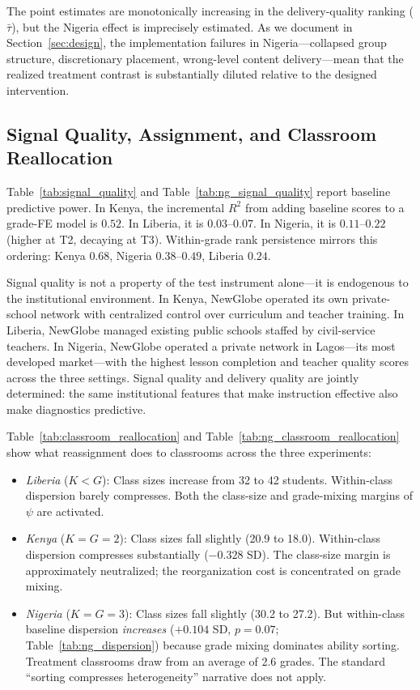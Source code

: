 \documentclass[11pt]{article}
\begin{document}
The point estimates are monotonically increasing in the delivery-quality ranking ($\bar{\tau}$), but the Nigeria effect is imprecisely estimated. As we document in Section~\ref{sec:design}, the implementation failures in Nigeria---collapsed group structure, discretionary placement, wrong-level content delivery---mean that the realized treatment contrast is substantially diluted relative to the designed intervention.

\subsection{Signal Quality, Assignment, and Classroom Reallocation}

Table~\ref{tab:signal_quality} and Table~\ref{tab:ng_signal_quality} report baseline predictive power. In Kenya, the incremental $R^2$ from adding baseline scores to a grade-FE model is $0.52$. In Liberia, it is $0.03$--$0.07$. In Nigeria, it is $0.11$--$0.22$ (higher at T2, decaying at T3). Within-grade rank persistence mirrors this ordering: Kenya $0.68$, Nigeria $0.38$--$0.49$, Liberia $0.24$.

Signal quality is not a property of the test instrument alone---it is endogenous to the institutional environment. In Kenya, NewGlobe operated its own private-school network with centralized control over curriculum and teacher training. In Liberia, NewGlobe managed existing public schools staffed by civil-service teachers. In Nigeria, NewGlobe operated a private network in Lagos---its most developed market---with the highest lesson completion and teacher quality scores across the three settings. Signal quality and delivery quality are jointly determined: the same institutional features that make instruction effective also make diagnostics predictive.

Table~\ref{tab:classroom_reallocation} and Table~\ref{tab:ng_classroom_reallocation} show what reassignment does to classrooms across the three experiments:

\begin{itemize}
\item \emph{Liberia} ($K < G$): Class sizes increase from 32 to 42 students. Within-class dispersion barely compresses. Both the class-size and grade-mixing margins of $\psi$ are activated.

\item \emph{Kenya} ($K = G = 2$): Class sizes fall slightly (20.9 to 18.0). Within-class dispersion compresses substantially ($-0.328$ SD). The class-size margin is approximately neutralized; the reorganization cost is concentrated on grade mixing.

\item \emph{Nigeria} ($K = G = 3$): Class sizes fall slightly (30.2 to 27.2). But within-class baseline dispersion \emph{increases} ($+0.104$ SD, $p = 0.07$; Table~\ref{tab:ng_dispersion}) because grade mixing dominates ability sorting. Treatment classrooms draw from an average of 2.6 grades. The standard ``sorting compresses heterogeneity'' narrative does not apply.
\end{itemize}
\end{document}
